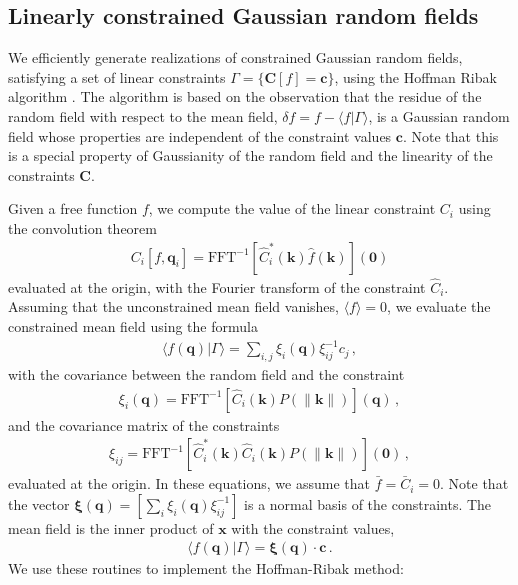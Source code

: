 \documentclass[a4paper, 11pt]{article}
\begin{document}
\subsection{Linearly constrained Gaussian random fields}
We efficiently generate realizations of constrained Gaussian random fields, satisfying a set of linear constraints $\Gamma=\{\bm{C}[f]=\bm{c}\}$, using the Hoffman Ribak algorithm \cite{Hoffman:1991, Weygaert:1996}. The algorithm is based on the observation that the residue of the random field with respect to the mean field, $\delta f = f - \langle f | \Gamma\rangle$, is a Gaussian random field whose properties are independent of the constraint values $\bm{c}$. Note that this is a special property of Gaussianity of the random field and the linearity of the constraints $\bm{C}$.

Given a free function $f$, we compute the value of the linear constraint $C_i$ using the convolution theorem
\begin{align}
C_i[f,\bm{q}_i]=\text{FFT}^{-1}[\hat{C}_i^*(\bm{k}) \hat{f}(\bm{k})](\bm{0})
\end{align}
evaluated at the origin, with the Fourier transform of the constraint $\hat{C}_i$. Assuming that the unconstrained mean field vanishes, $\langle f \rangle =0$, we evaluate the constrained mean field using the formula
\begin{align}
\langle f(\bm{q}) | \Gamma\rangle = \sum_{i,j} \xi_i(\bm{q})\xi_{ij}^{-1} c_j\,,
\end{align}
with the covariance between the random field and the constraint
\begin{align}
\xi_i(\bm{q}) = \text{FFT}^{-1}[\hat{C}_i(\bm{k}) P(\|\bm{k}\|)](\bm{q})\,,
\end{align}
and the covariance matrix of the constraints
\begin{align}
\xi_{ij}=\text{FFT}^{-1}[\hat{C}_i^*(\bm{k}) \hat{C}_i(\bm{k}) P(\|\bm{k}\|)](\bm{0})\,,
\end{align}
evaluated at the origin. In these equations, we assume that $\bar{f}=\bar{C}_i=0$. Note that the vector $\bm{\xi}(\bm{q})=[\sum_i \xi_i(\bm{q}) \xi_{ij}^{-1}]$ is a normal basis of the constraints. The mean field is the inner product of $\bm{x}$ with the constraint values, 
\begin{align}
\langle f(\bm{q}) | \Gamma\rangle = \bm{\xi}(\bm{q})\cdot \bm{c}\,.
\end{align}
We use these routines to implement the Hoffman-Ribak method:\\
\end{document}
